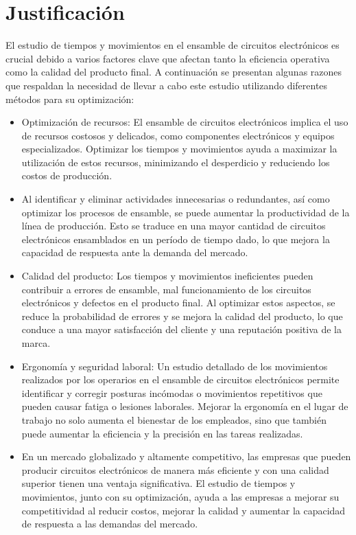         \section{Justificación}
    
        El estudio de tiempos y movimientos en el ensamble de circuitos electrónicos es crucial debido a varios factores clave que afectan tanto la eficiencia operativa como la calidad del producto final. A continuación se presentan algunas razones que respaldan la necesidad de llevar a cabo este estudio utilizando diferentes métodos para su optimización:
        \begin{itemize}
            \item Optimización de recursos: El ensamble de circuitos electrónicos implica el uso de recursos costosos y delicados, como componentes electrónicos y equipos especializados. Optimizar los tiempos y movimientos ayuda a maximizar la utilización de estos recursos, minimizando el desperdicio y reduciendo los costos de producción.
            \item  Al identificar y eliminar actividades innecesarias o redundantes, así como optimizar los procesos de ensamble, se puede aumentar la productividad de la línea de producción. Esto se traduce en una mayor cantidad de circuitos electrónicos ensamblados en un período de tiempo dado, lo que mejora la capacidad de respuesta ante la demanda del mercado.
            \item Calidad del producto: Los tiempos y movimientos ineficientes pueden contribuir a errores de ensamble, mal funcionamiento de los circuitos electrónicos y defectos en el producto final. Al optimizar estos aspectos, se reduce la probabilidad de errores y se mejora la calidad del producto, lo que conduce a una mayor satisfacción del cliente y una reputación positiva de la marca.
            \item Ergonomía y seguridad laboral: Un estudio detallado de los movimientos realizados por los operarios en el ensamble de circuitos electrónicos permite identificar y corregir posturas incómodas o movimientos repetitivos que pueden causar fatiga o lesiones laborales. Mejorar la ergonomía en el lugar de trabajo no solo aumenta el bienestar de los empleados, sino que también puede aumentar la eficiencia y la precisión en las tareas realizadas.
            \item  En un mercado globalizado y altamente competitivo, las empresas que pueden producir circuitos electrónicos de manera más eficiente y con una calidad superior tienen una ventaja significativa. El estudio de tiempos y movimientos, junto con su optimización, ayuda a las empresas a mejorar su competitividad al reducir costos, mejorar la calidad y aumentar la capacidad de respuesta a las demandas del mercado.
        \end{itemize}
    
